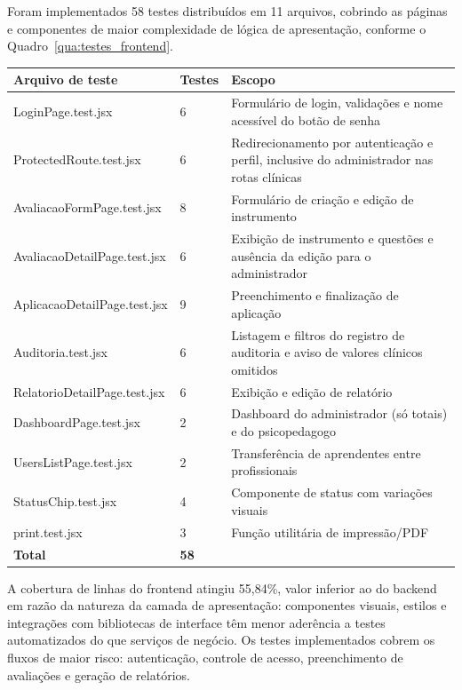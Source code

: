 Foram implementados 58 testes distribuídos em 11 arquivos, cobrindo as páginas e componentes de maior complexidade de lógica de apresentação, conforme o Quadro~\ref{qua:testes_frontend}.

\begin{quadro}[H]
\centering
\small
\caption{Distribuição dos testes automatizados do frontend}
\begin{tabular}{p{6cm} p{3cm} p{4.5cm}}
\hline
\textbf{Arquivo de teste} & \textbf{Testes} & \textbf{Escopo} \\
\hline
LoginPage.test.jsx & 6 & Formulário de login, validações e nome acessível do botão de senha \\
ProtectedRoute.test.jsx & 6 & Redirecionamento por autenticação e perfil, inclusive do administrador nas rotas clínicas \\
AvaliacaoFormPage.test.jsx & 8 & Formulário de criação e edição de instrumento \\
AvaliacaoDetailPage.test.jsx & 6 & Exibição de instrumento e questões e ausência da edição para o administrador \\
AplicacaoDetailPage.test.jsx & 9 & Preenchimento e finalização de aplicação \\
Auditoria.test.jsx & 6 & Listagem e filtros do registro de auditoria e aviso de valores clínicos omitidos \\
RelatorioDetailPage.test.jsx & 6 & Exibição e edição de relatório \\
DashboardPage.test.jsx & 2 & Dashboard do administrador (só totais) e do psicopedagogo \\
UsersListPage.test.jsx & 2 & Transferência de aprendentes entre profissionais \\
StatusChip.test.jsx & 4 & Componente de status com variações visuais \\
print.test.jsx & 3 & Função utilitária de impressão/PDF \\
\hline
\textbf{Total} & \textbf{58} & \\
\hline
\end{tabular}
\label{qua:testes_frontend}
\end{quadro}

A cobertura de linhas do frontend atingiu 55,84\%, valor inferior ao do backend em razão da natureza da camada de apresentação: componentes visuais, estilos e integrações com bibliotecas de interface têm menor aderência a testes automatizados do que serviços de negócio. Os testes implementados cobrem os fluxos de maior risco: autenticação, controle de acesso, preenchimento de avaliações e geração de relatórios.